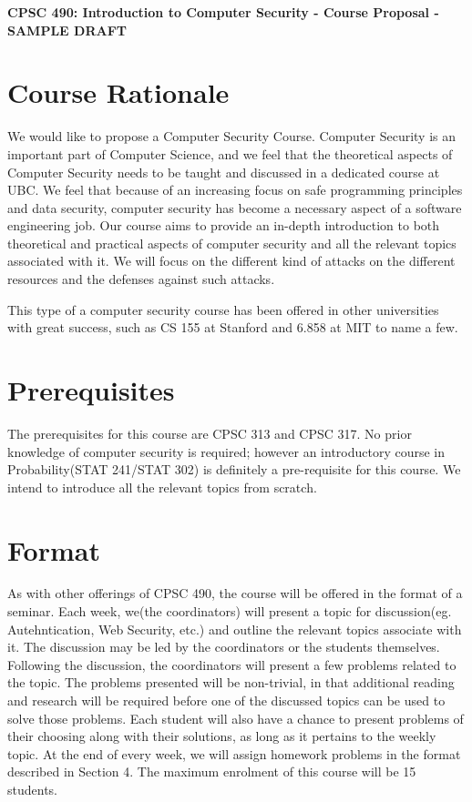 \documentclass[11pt]{article}
\begin{document}
\centerline{\textbf{CPSC 490: Introduction to Computer Security - Course Proposal - SAMPLE DRAFT}}

\section{Course Rationale}

We would like to propose a Computer Security Course. Computer Security is an important part of Computer Science, and we feel that the theoretical aspects of Computer Security needs to be taught and discussed in a dedicated course at UBC. We feel that because of an increasing focus on safe programming principles and data security, computer security has become a necessary aspect of a software engineering job. Our course aims to provide an in-depth introduction to both theoretical and practical aspects of computer security and all the relevant topics associated with it. We will focus on the different kind of attacks on the different resources and the defenses against such attacks. 

This type of a computer security course has been offered in other universities with great success, such as CS 155 at Stanford and 6.858 at MIT to name a few.

\section{Prerequisites}

The prerequisites for this course are CPSC 313 and CPSC 317. No prior knowledge of computer security is required; however an introductory course in Probability(STAT 241/STAT 302) is definitely a pre-requisite for this course. We intend to introduce all the relevant topics from scratch.

\section{Format}

As with other offerings of CPSC 490, the course will be offered in the format of a seminar. Each week, we(the coordinators) will present a topic for discussion(eg. Autehntication, Web Security, etc.) and outline the relevant topics associate with it. The discussion may be led by the coordinators or the students themselves. Following the discussion, the coordinators will present a few problems related to the topic. The problems presented will be non-trivial, in that additional reading and research will be required before one of the discussed topics can be used to solve those problems. Each student will also have a chance to present problems of their choosing along with their solutions, as long as it pertains to the weekly topic. At the end of every week, we will assign homework problems in the format described in Section 4. The maximum enrolment of this course will be 15 students. 
\end{document}
